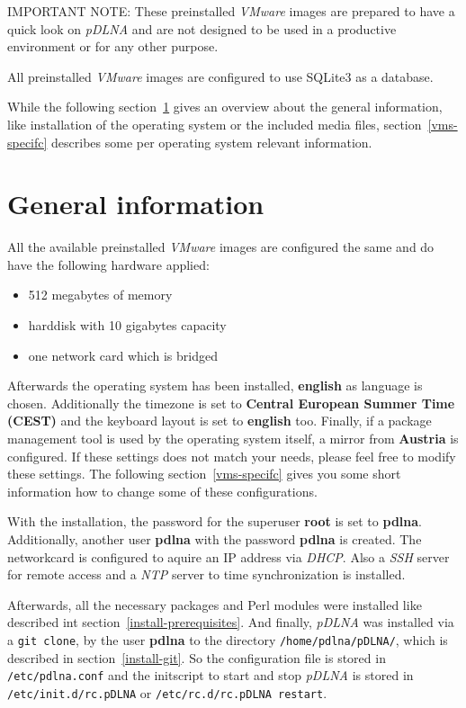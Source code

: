 \documentclass[a4paper,oneside,10pt]{report}
\newenvironment{colframeimportantnote}{%
  \begin{Sbox}
    \begin{minipage}{.99\columnwidth}
}{%
  \end{minipage}
  \end{Sbox}
  \begin{center}
    \fcolorbox{black}{Orange}{\TheSbox}
  \end{center}
}
\begin{document}
\begin{colframeimportantnote}
\textsc{IMPORTANT NOTE:} These preinstalled {\em VMware} images are prepared to have a quick look on {\em pDLNA} and are not designed to be used in a productive environment or for any other purpose.
\end{colframeimportantnote}

All preinstalled {\em VMware} images are configured to use SQLite3 as a database.

While the following section~\ref{vms-general} gives an overview about the general information, like installation of the operating system or the included media files, section~\ref{vms-specifc} describes some per operating system relevant information.

\section{General information}
\label{vms-general}

All the available preinstalled {\em VMware} images are configured the same and do have the following hardware applied:
\begin{itemize}
	\item 512 megabytes of memory
	\item harddisk with 10 gigabytes capacity
	\item one network card which is bridged
\end{itemize}

Afterwards the operating system has been installed, \textbf{english} as language is chosen. Additionally the timezone is set to \textbf{Central European Summer Time (CEST)} and the keyboard layout is set to \textbf{english} too. Finally, if a package management tool is used by the operating system itself, a mirror from \textbf{Austria} is configured. If these settings does not match your needs, please feel free to modify these settings. The following section~\ref{vms-specifc} gives you some short information how to change some of these configurations.

With the installation, the password for the superuser \textbf{root} is set to \textbf{pdlna}. Additionally, another user \textbf{pdlna} with the password \textbf{pdlna} is created. The networkcard is configured to aquire an IP address via {\em DHCP}. Also a {\em SSH} server for remote access and a {\em NTP} server to time synchronization is installed.

Afterwards, all the necessary packages and Perl modules were installed like described int section~\ref{install-prerequisites}. And finally, {\em pDLNA} was installed via a \verb|git clone|, by the user \textbf{pdlna} to the directory \verb|/home/pdlna/pDLNA/|, which is described in section~\ref{install-git}. So the configuration file is stored in \verb|/etc/pdlna.conf| and the initscript to start and stop {\em pDLNA} is stored in \verb|/etc/init.d/rc.pDLNA| or \verb|/etc/rc.d/rc.pDLNA restart|.
\end{document}
